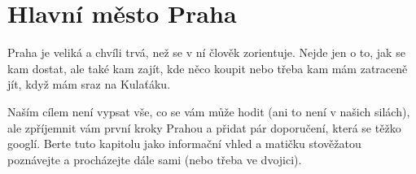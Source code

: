 \section{Hlavní město Praha}
Praha je veliká a chvíli trvá, než se v ní člověk zorientuje. Nejde jen o to,
jak se kam dostat, ale také kam zajít, kde něco koupit nebo třeba kam mám
zatraceně jít, když mám sraz na Kulaťáku.

Naším cílem není vypsat vše, co se vám může hodit (ani to není v našich silách),
ale zpříjemnit vám první kroky Prahou a přidat pár doporučení, která se těžko
googlí. Berte tuto kapitolu jako informační vhled a matičku stověžatou
poznávejte a procházejte dále sami (nebo třeba ve dvojici).